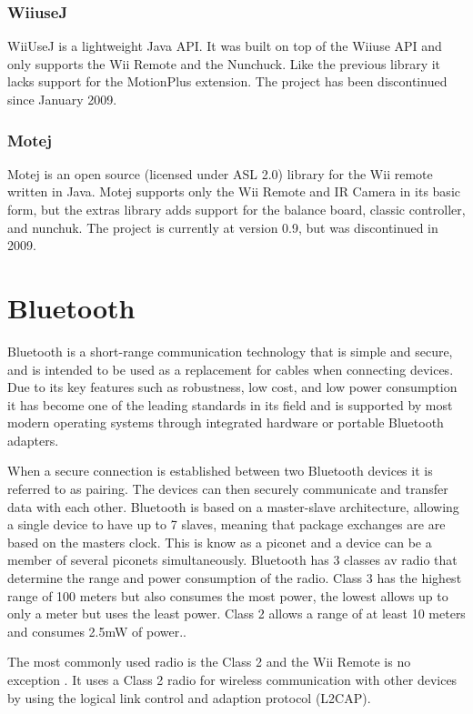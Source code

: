 \subsubsection{WiiuseJ}
WiiUseJ is a lightweight Java API. It was built on top of the Wiiuse API and only supports the Wii Remote and the Nunchuck. Like the previous library it lacks support for the MotionPlus extension. The project has been discontinued since January 2009. \cite{Wiiusej}

\subsubsection{Motej}
Motej is an open source (licensed under ASL 2.0) library for the Wii remote written in Java. Motej supports only the Wii Remote and IR Camera in its basic form, but the extras library adds support for the balance board, classic controller, and nunchuk. The project is currently at version 0.9, but was discontinued in 2009. \cite{Motej}

\section{Bluetooth}
Bluetooth is a short-range communication technology that is simple and secure, and is intended to be used as a replacement for cables when connecting devices. Due to its key features such as robustness, low cost, and low power consumption it has become one of the leading standards in its field and is supported by most modern operating systems through integrated hardware or portable Bluetooth adapters.

When a secure connection is established between two Bluetooth devices it is referred to as pairing. The devices can then securely communicate and transfer data with each other. Bluetooth is based on a master-slave architecture, allowing a single device to have up to 7 slaves, meaning that package exchanges are are based on the masters clock. This is know as a piconet and a device can be a member of several piconets simultaneously. Bluetooth has 3 classes av radio that determine the range and power consumption of the radio. Class 3 has the highest range of 100 meters but also consumes the most power, the lowest allows up to only a meter but uses the least power. Class 2 allows a range of at least 10 meters and consumes 2.5mW of power.\cite{bluetooth}.

The most commonly used radio is the Class 2 and the Wii Remote is no exception \cite{controllerSpecs}. It uses a Class 2 radio for wireless communication with other devices by using the logical link control and adaption protocol (L2CAP).
